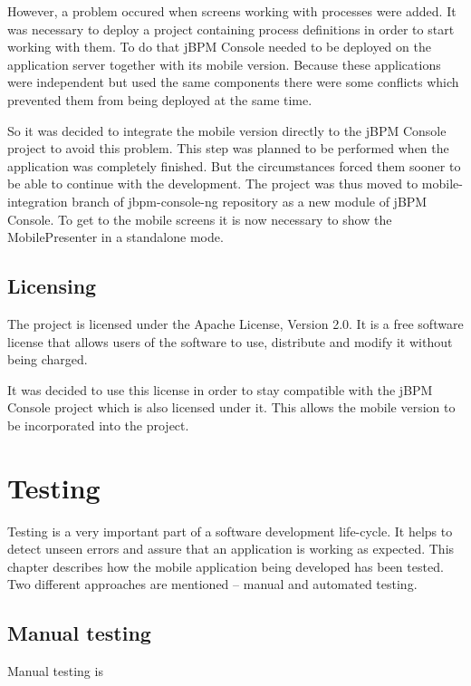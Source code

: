 \documentclass[12pt,oneside,final]{fithesis2}
\begin{document}
However, a problem occured when screens working with processes were added.
It was necessary to deploy a project containing process definitions in order to start working with them.
To do that jBPM Console needed to be deployed on the application server together with its mobile version.
Because these applications were independent but used the same components there were some conflicts which prevented them from being deployed at the same time.

So it was decided to integrate the mobile version directly to the jBPM Console project to avoid this problem.
This step was planned to be performed when the application was completely finished.
But the circumstances forced them sooner to be able to continue with the development.
The project was thus moved to mobile-integration branch of jbpm-console-ng repository\footnotemark{} as a new module of jBPM Console.
To get to the mobile screens it is now necessary to show the MobilePresenter in a standalone mode.

\section{Licensing}
The project is licensed under the Apache License, Version 2.0\footnotemark{}.
It is a free software license that allows users of the software to use, distribute and modify it without being charged.

It was decided to use this license in order to stay compatible with the jBPM Console project which is also licensed under it.
This allows the mobile version to be incorporated into the project.

\chapter{Testing}
Testing is a very important part of a software development life-cycle.
It helps to detect unseen errors and assure that an application is working as expected.
This chapter describes how the mobile application being developed has been tested.
Two different approaches are mentioned -- manual and automated testing.

\section{Manual testing}
Manual testing is 
\end{document}
